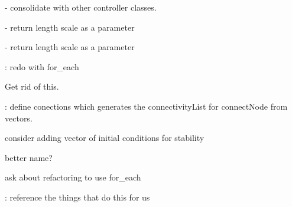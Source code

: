 
\begin{DoxyRefList}
\item[\label{todo__todo000031}%
\hypertarget{todo__todo000031}{}%
Member \hyperlink{class_base_spine_c_p_g_control_aa209e0699b3dfc5889c6084409be4d20}{Base\-Spine\-C\-P\-G\-Control\-:\-:on\-Teardown} (\hyperlink{class_base_spine_model_learning}{Base\-Spine\-Model\-Learning} \&subject)]-\/ consolidate with other controller classes. 

-\/ return length scale as a parameter 

-\/ return length scale as a parameter  
\item[\label{todo__todo000030}%
\hypertarget{todo__todo000030}{}%
Member \hyperlink{class_base_spine_c_p_g_control_a4f54eecdac3f19693752a77a8668f119}{Base\-Spine\-C\-P\-G\-Control\-:\-:setup\-C\-P\-Gs} (\hyperlink{class_base_spine_model_learning}{Base\-Spine\-Model\-Learning} \&subject, array\-\_\-2\-D node\-Actions, array\-\_\-4\-D edge\-Actions)]\-: redo with for\-\_\-each  
\item[\label{todo__todo000042}%
\hypertarget{todo__todo000042}{}%
Member \hyperlink{class_contact_test_model_a9bebeeb19f836cb456aa187a76015675}{Contact\-Test\-Model\-:\-:setup} (\hyperlink{classtg_world}{tg\-World} \&world)]Get rid of this.  
\item[\label{todo__todo000117}%
\hypertarget{todo__todo000117}{}%
Member \hyperlink{class_c_p_g_equations_a99b42aef759c8915005352aba8ff6fbe}{C\-P\-G\-Equations\-:\-:define\-Connections} (int node\-Index, std\-::vector$<$ int $>$ connections, std\-::vector$<$ double $>$ new\-Weights, std\-::vector$<$ double $>$ new\-Phase\-Offsets)]\-: define conections which generates the connectivity\-List for connect\-Node from vectors.  
\item[\label{todo__todo000120}%
\hypertarget{todo__todo000120}{}%
Member \hyperlink{class_c_p_g_node_adf85adc940fc65c55661d2c54680761b}{C\-P\-G\-Node\-:\-:C\-P\-G\-Node} (int node\-Num, const std\-::vector$<$ double $>$ \&params)]consider adding vector of initial conditions for stability  
\item[\label{todo__todo000121}%
\hypertarget{todo__todo000121}{}%
Member \hyperlink{class_c_p_g_node_ad48c60bc4b025c3bb3aac740183ccac6}{C\-P\-G\-Node\-:\-:update\-D\-Ts} (double desc\-Com)]better name? 

ask about refactoring to use for\-\_\-each  
\item[\label{todo__todo000034}%
\hypertarget{todo__todo000034}{}%
Member \hyperlink{class_flemons_spine_model_learning_ad7d329634cf8d812bcee974a3430fcee}{Flemons\-Spine\-Model\-Learning\-:\-:setup} (\hyperlink{classtg_world}{tg\-World} \&world)]\-: reference the things that do this for us 


\end{DoxyRefList}
